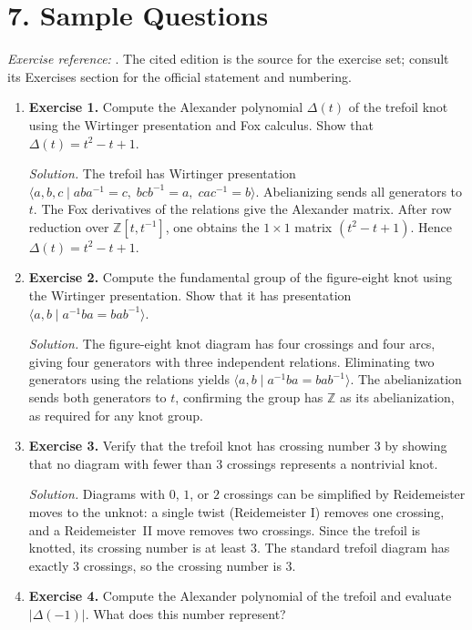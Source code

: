 \section*{7. Sample Questions}
\emph{Exercise reference:} \cite{knot_theory_ref1}. The cited edition is the source for the exercise set; consult its Exercises section for the official statement and numbering.
\begin{enumerate}[leftmargin=*,itemsep=0.9em]
\item \textbf{Exercise 1.} Compute the Alexander polynomial $\Delta(t)$ of the trefoil knot using the Wirtinger presentation and Fox calculus. Show that $\Delta(t)=t^2-t+1$.

\emph{Solution.} The trefoil has Wirtinger presentation $\langle a,b,c\mid aba^{-1}=c,\; bcb^{-1}=a,\; cac^{-1}=b\rangle$. Abelianizing sends all generators to $t$. The Fox derivatives of the relations give the Alexander matrix. After row reduction over $\mathbb{Z}[t,t^{-1}]$, one obtains the $1\times 1$ matrix $(t^2-t+1)$. Hence $\Delta(t)=t^2-t+1$.

\item \textbf{Exercise 2.} Compute the fundamental group of the figure-eight knot using the Wirtinger presentation. Show that it has presentation $\langle a,b\mid a^{-1}ba=bab^{-1}\rangle$.

\emph{Solution.} The figure-eight knot diagram has four crossings and four arcs, giving four generators with three independent relations. Eliminating two generators using the relations yields $\langle a,b\mid a^{-1}ba=bab^{-1}\rangle$. The abelianization sends both generators to $t$, confirming the group has $\mathbb{Z}$ as its abelianization, as required for any knot group.

\item \textbf{Exercise 3.} Verify that the trefoil knot has crossing number $3$ by showing that no diagram with fewer than $3$ crossings represents a nontrivial knot.

\emph{Solution.} Diagrams with $0$, $1$, or $2$ crossings can be simplified by Reidemeister moves to the unknot: a single twist (Reidemeister I) removes one crossing, and a Reidemeister~II move removes two crossings. Since the trefoil is knotted, its crossing number is at least $3$. The standard trefoil diagram has exactly $3$ crossings, so the crossing number is $3$.

\item \textbf{Exercise 4.} Compute the Alexander polynomial of the trefoil and evaluate $|\Delta(-1)|$. What does this number represent?


\end{enumerate}
